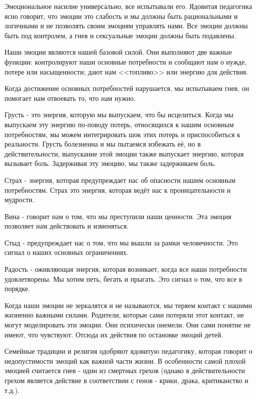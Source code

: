 \documentclass[10pt, fleqn]{article}
\begin{document}

Эмоциональное насилие универсально, все испытывали его. Ядовитая педагогика ясно говорит, что эмоции это слабость и мы должны быть рациональными и логичными и не позволять своим эмоциям управлять нами. Все эмоции должны быть под контролем, а гнев и сексуальные эмоции должны быть подавлены.


Наши эмоции являются нашей базовой силой. Они выполняют две важные функции: контролируют наши основные потребности и сообщают нам о нужде, потере или насыщенности; дают нам <<топливо>> или энергию для действия.

Когда достижение основных потребностей нарушается, мы испытываем гнев, он помогает нам отвоевать то, что нам нужно.

Грусть - это энергия, которую мы выпускаем, что бы исцелиться. Когда мы выпускаем эту энергию по-поводу потерь, относящихся к нашим основным потребностям, мы можем интегрировать шок этих потерь и приспособиться к реальности. Грусть болезненна и мы пытаемся избежать её, но в действительности, выпускание этой эмоции также выпускает энергию, которая вызывает боль. Задерживая эту эмоцию, мы также задерживаем боль.

Страх - энергия, которая предупреждает нас об опасности нашим основным потребностям. Страх это энергия, которая ведёт нас к проницательности и мудрости.

Вина - говорит нам о том, что мы преступили наши ценности. Эта эмоция позволяет нам действовать и изменяться.

Стыд - предупреждает нас о том, что мы вышли за рамки человечности. Это сигнал о наших основных ограничениях.

Радость - оживляющая энергия, которая возникает, когда все наши потребности удовлетворены. Мы хотим петь, бегать и прыгать. Это сигнал о том, что все в порядке.

Когда наши эмоции не зеркалятся и не называются, мы теряем контакт с нашими жизненно важными силами. Родители, которые сами потеряли этот контакт, не могут моделировать эти эмоции. Они психически онемели. Они сами понятие не имеют, что чувствуют. Отсюда их действия по остановке эмоций детей.

Семейные традиции и религия одобряют ядовитую педагогику, которая говорит о недопустимости эмоций как важной части жизни. В особенности самой плохой эмоцией считается гнев - один из смертных грехов (однако в действительности грехом является действие в соответствии с генов - крики, драка, критиканство и т.д.).
\end{document}
